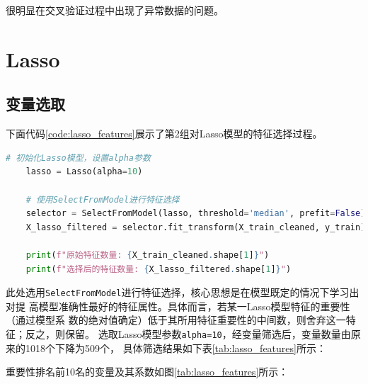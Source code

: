 \documentclass[
    report,     %
    oneside,    %
    UTF8,       %
    zihao=-4    %
]{config} %
\begin{document}
\begin{table}[htbp]
    \centering
    \caption{OLS模型在样本内外以及交叉验证的MAE、$R^2$、$Adj. R^2$}
    \label{tab:ols_mae_r2}
\end{table}

很明显在交叉验证过程中出现了异常数据的问题。

\section{Lasso}
\subsection{变量选取}
下面代码\ref{code:lasso_features}展示了第2组对Lasso模型的特征选择过程。
\begin{lstlisting}[label=code:lasso_features, language=Python, caption=Lasso模型特征选取]
    # 初始化Lasso模型，设置alpha参数  
    lasso = Lasso(alpha=10)  
    
    # 使用SelectFromModel进行特征选择  
    selector = SelectFromModel(lasso, threshold='median', prefit=False)  
    X_lasso_filtered = selector.fit_transform(X_train_cleaned, y_train)  
    
    print(f"原始特征数量: {X_train_cleaned.shape[1]}")  
    print(f"选择后的特征数量: {X_lasso_filtered.shape[1]}")
\end{lstlisting}

此处选用\lstinline{SelectFromModel}进行特征选择，核心思想是在模型既定的情况下学习出对提
高模型准确性最好的特征属性。具体而言，若某一Lasso模型特征的重要性（通过模型系
数的绝对值确定）低于其所用特征重要性的中间数，则舍弃这一特征；反之，则保留。
选取Lasso模型参数\lstinline{alpha=10}，经变量筛选后，变量数量由原来的1018个下降为509个，
具体筛选结果如下表\ref{tab:lasso_features}所示：

重要性排名前10名的变量及其系数如图\ref{tab:lasso_features}所示：
\end{document}
